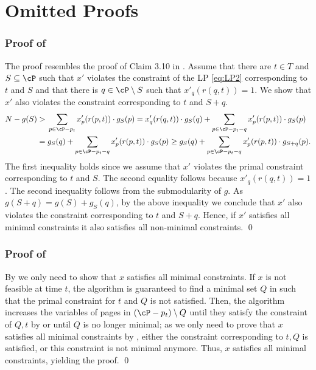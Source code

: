 \section{Omitted Proofs}
\label{sec:omit}


\subsubsection*{Proof of }
	The proof resembles the proof of Claim 3.10 in \cite{coester2022competitive}. Assume that there are $t \in T$ and $S \subseteq \cP$ such that $x'$ violates the constraint of the LP \eqref{eq:LP2} corresponding to $t$ and  $S$ and that there is $q \in \cP \setminus S$ such that $x'_q(r(q,t)) = 1$. We show that $x'$ also violates the constraint corresponding to $t$ and $S+q$.  %
	\begin{equation*}
		\label{eq:PQPQPQ}
		\begin{aligned}
	 N-g(S) >{} & \sum_{p \in \cP-p_t} x'_p(r(p,t)) \cdot g_S(p)
	 = x'_q(r(q,t)) \cdot g_S(q)+\sum_{p \in \cP-p_t-q} x'_p(r(p,t)) \cdot g_S(p)\\
	 ={} & g_S(q)+\sum_{p \in \cP-p_t-q} x'_p(r(p,t)) \cdot g_S(p)
	  \geq g_S(q)+\sum_{p \in \cP-p_t-q} x'_p(r(p,t)) \cdot g_{S+q}(p).\\
		\end{aligned}
	\end{equation*} The first inequality holds since we assume that $x'$ violates the primal constraint corresponding to $t$ and $S$. The second equality follows because $x'_q(r(q,t)) = 1$. The second inequality follows from the submodularity of $g$. As $g(S+q) = g(S)+g_{S}(q)$, by the above inequality we conclude that $x'$ also violates the constraint corresponding to $t$ and $S+q$. Hence, if $x'$ satisfies all minimal constraints it also satisfies all non-minimal constraints. \qed



\subsubsection*{Proof of }
 By  we only need to show that $x$ satisfies all minimal constraints. %
If $x$ is not feasible at time $t$, the algorithm is guaranteed to find a minimal set $Q$ in  such that the primal constraint for $t$ and $Q$ is not satisfied. Then, the algorithm increases the variables of pages in $(\cP-p_t) \setminus Q$ until they satisfy the constraint of $Q,t$ by   or until $Q$ is no longer minimal; as we only need to prove that $x$ satisfies all minimal constraints by , either the constraint corresponding to $t,Q$ is satisfied, or this constraint is not minimal anymore. %
Thus, $x$ satisfies all minimal constraints, yielding the proof. \qed







